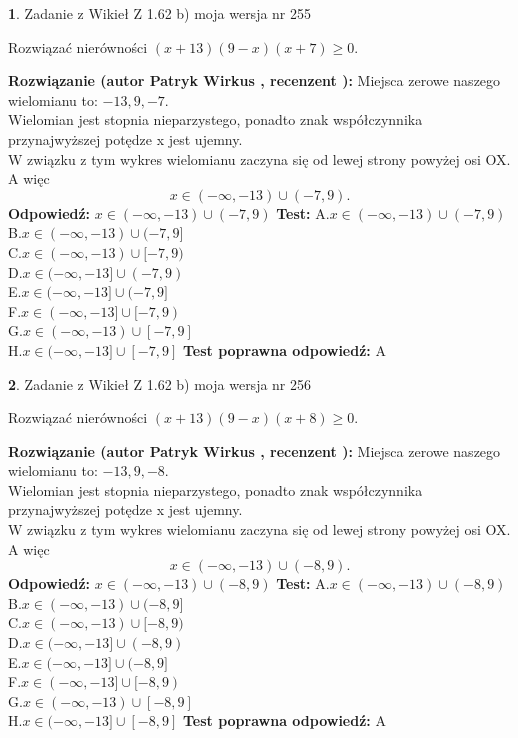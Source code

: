 \documentclass[12pt, a4paper]{article}
\theoremstyle{definition} %
\newtheorem{zad}{}
\newcommand{\zadStart}[1]{\begin{zad}#1\newline}
\newcommand{\zadStop}{\end{zad}}
\newcommand{\rozwStart}[2]{\noindent \textbf{Rozwiązanie (autor #1 , recenzent #2): }\newline}
\newcommand{\rozwStop}{\newline}
\newcommand{\odpStart}{\noindent \textbf{Odpowiedź:}\newline}
\newcommand{\odpStop}{\newline}
\newcommand{\testStart}{\noindent \textbf{Test:}\newline}
\newcommand{\testStop}{\newline}
\newcommand{\kluczStart}{\noindent \textbf{Test poprawna odpowiedź:}\newline}
\newcommand{\kluczStop}{\newline}
\begin{document}
\zadStart{Zadanie z Wikieł Z 1.62 b) moja wersja nr 255}

Rozwiązać nierówności $(x+13)(9-x)(x+7)\ge0$.
\zadStop
\rozwStart{Patryk Wirkus}{}
Miejsca zerowe naszego wielomianu to: $-13, 9, -7$.\\
Wielomian jest stopnia nieparzystego, ponadto znak współczynnika przy\linebreak najwyższej potędze x jest ujemny.\\ W związku z tym wykres wielomianu zaczyna się od lewej strony powyżej osi OX. A więc $$x \in (-\infty,-13) \cup (-7,9).$$
\rozwStop
\odpStart
$x \in (-\infty,-13) \cup (-7,9)$
\odpStop
\testStart
A.$x \in (-\infty,-13) \cup (-7,9)$\\
B.$x \in (-\infty,-13) \cup (-7,9]$\\
C.$x \in (-\infty,-13) \cup [-7,9)$\\
D.$x \in (-\infty,-13] \cup (-7,9)$\\
E.$x \in (-\infty,-13] \cup (-7,9]$\\
F.$x \in (-\infty,-13] \cup [-7,9)$\\
G.$x \in (-\infty,-13) \cup [-7,9]$\\
H.$x \in (-\infty,-13] \cup [-7,9]$
\testStop
\kluczStart
A
\kluczStop



\zadStart{Zadanie z Wikieł Z 1.62 b) moja wersja nr 256}

Rozwiązać nierówności $(x+13)(9-x)(x+8)\ge0$.
\zadStop
\rozwStart{Patryk Wirkus}{}
Miejsca zerowe naszego wielomianu to: $-13, 9, -8$.\\
Wielomian jest stopnia nieparzystego, ponadto znak współczynnika przy\linebreak najwyższej potędze x jest ujemny.\\ W związku z tym wykres wielomianu zaczyna się od lewej strony powyżej osi OX. A więc $$x \in (-\infty,-13) \cup (-8,9).$$
\rozwStop
\odpStart
$x \in (-\infty,-13) \cup (-8,9)$
\odpStop
\testStart
A.$x \in (-\infty,-13) \cup (-8,9)$\\
B.$x \in (-\infty,-13) \cup (-8,9]$\\
C.$x \in (-\infty,-13) \cup [-8,9)$\\
D.$x \in (-\infty,-13] \cup (-8,9)$\\
E.$x \in (-\infty,-13] \cup (-8,9]$\\
F.$x \in (-\infty,-13] \cup [-8,9)$\\
G.$x \in (-\infty,-13) \cup [-8,9]$\\
H.$x \in (-\infty,-13] \cup [-8,9]$
\testStop
\kluczStart
A
\kluczStop
\end{document}
